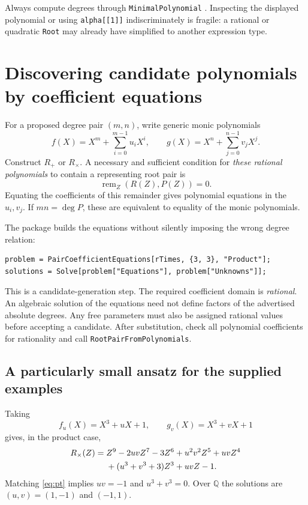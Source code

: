 \documentclass[11pt,a4paper]{article}
\newcommand{\Q}{\mathbb Q}
\newcommand{\code}[1]{\texttt{#1}}
\theoremstyle{definition}
\theoremstyle{remark}
\begin{document}
Always compute degrees through \code{MinimalPolynomial} \cite{minpoly}. Inspecting the displayed polynomial or using \code{alpha[[1]]} indiscriminately is fragile: a rational or quadratic \code{Root} may already have simplified to another expression type.

\section{Discovering candidate polynomials by coefficient equations}
\label{sec:inverse}
For a proposed degree pair $(m,n)$, write generic monic polynomials
\[
 f(X)=X^m+\sum_{i=0}^{m-1}u_iX^i,\qquad
 g(X)=X^n+\sum_{j=0}^{n-1}v_jX^j.
\]
Construct $R_+$ or $R_{\times}$. A necessary and sufficient condition for \emph{these rational polynomials} to contain a representing root pair is
\begin{equation}
 \operatorname{rem}_Z(R(Z),P(Z))=0.
 \label{eq:divisibility}
\end{equation}
Equating the coefficients of this remainder gives polynomial equations in the $u_i,v_j$. If $mn=\deg P$, these are equivalent to equality of the monic polynomials.

The package builds the equations without silently imposing the wrong degree relation:
\begin{lstlisting}
problem = PairCoefficientEquations[rTimes, {3, 3}, "Product"];
solutions = Solve[problem["Equations"], problem["Unknowns"]];
\end{lstlisting}
This is a candidate-generation step. The required coefficient domain is \emph{rational}. An algebraic solution of the equations need not define factors of the advertised absolute degrees. Any free parameters must also be assigned rational values before accepting a candidate. After substitution, check all polynomial coefficients for rationality and call \code{RootPairFromPolynomials}.

\subsection{A particularly small ansatz for the supplied examples}
Taking
\[
 f_u(X)=X^3+uX+1,\qquad g_v(X)=X^3+vX+1
\]
gives, in the product case,
\begin{align}
 R_{\times}(Z)={}&Z^9-2uvZ^7-3Z^6+u^2v^2Z^5+uvZ^4\notag\\
 &+(u^3+v^3+3)Z^3+uvZ-1.
 \label{eq:sparseproduct}
\end{align}
Matching \eqref{eq:pt} implies $uv=-1$ and $u^3+v^3=0$. Over $\Q$ the solutions are $(u,v)=(1,-1)$ and $(-1,1)$.
\end{document}
